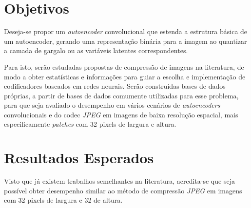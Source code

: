 \section{Objetivos}
\label{sec:objetivos}
Deseja-se propor um \textit{autoencoder} convolucional que estenda a estrutura básica de um autoencoder, gerando uma representação binária para a imagem ao quantizar a camada de gargalo ou as variáveis latentes correspondentes.

Para isto, serão estudadas propostas de compressão de imagens na literatura, de modo a obter estatísticas e informações para guiar a escolha e implementação de codificadores baseados em redes neurais. Serão construídas bases de dados próprias, a partir de bases de dados comumente utilizadas para esse problema, para que seja avaliado o desempenho em vários cenários de \textit{autoencoders} convolucionais e do codec \textit{JPEG} em imagens de baixa resolução espacial, mais especificamente \textit{patches} com 32 pixels de largura e altura.
\section{Resultados Esperados}
\label{sec:expectativa}
Visto que já existem trabalhos semelhantes na literatura, acredita-se que seja possível obter desempenho similar ao método de compressão \textit{JPEG} em imagens com 32 pixels de largura e 32 de altura.


